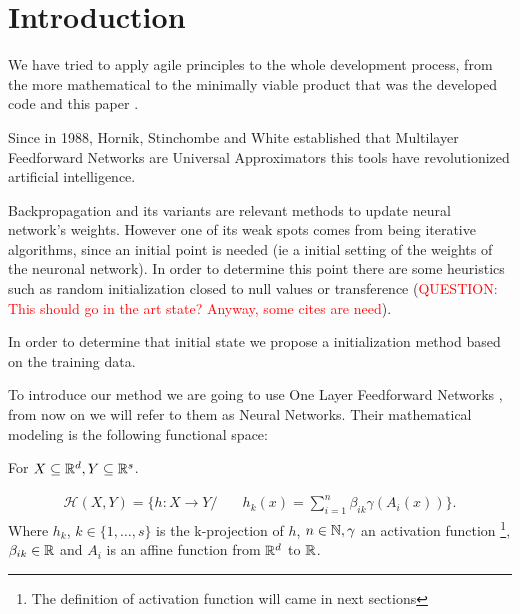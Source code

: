 \section*{Introduction} %

We have tried to apply agile principles to the whole development process, from
the more mathematical to the minimally viable product that was the developed
code and this paper \cite{DBLP:journals/corr/abs-2104-12545}.

Since in 1988, Hornik, Stinchombe and White established
that Multilayer Feedforward Networks are Universal Approximators \cite{HORNIK1989359} this tools have revolutionized artificial intelligence. 

Backpropagation \cite{backpropagation-Hinton} and its 
variants are relevant methods to update neural 
network's weights. However one of its weak spots comes from being iterative 
algorithms, since an initial point is needed (ie a initial setting of the weights of the neuronal network). In order to determine this point 
there are some heuristics such as random initialization
closed to null values or transference (\textcolor{red}{QUESTION: This should go in the art state? Anyway, some cites are need}). 

In order to determine that initial state we propose a initialization method based on the training data. 

To introduce our method we are going to use One Layer
Feedforward Networks \cite{HORNIK1989359} , from now on we will refer to them as Neural Networks. Their mathematical modeling is the following functional space: 

    For $X \subseteq \mathbb{R}^d, Y \subseteq \mathbb{R}^s$. 

    \begin{align} \label{nn_functional_space}
        \mathcal{H}(X,Y) 
        =
        \{
            h : X \longrightarrow Y 
            /& \quad 
            h_k(x) = 
            \sum_{i=1}^{n} \beta_{i k} \gamma( A_{i}(x))          
        \}.
    \end{align}
    Where $h_k$, $k \in \{1, \ldots, s\}$ is the k-projection of $h$, 
    $n \in \mathbb{N},\gamma$ an activation function 
    \footnote{The definition of activation function will came in next sections }, $\beta_{i k} \in \mathbb{R}$ and $A_{i}$ is an affine function from $\mathbb{R}^d$ to $\mathbb{R}$. 


